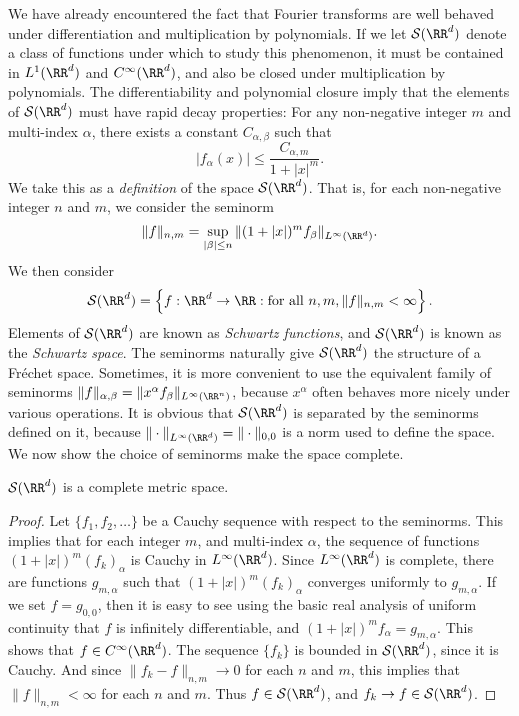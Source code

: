 We have already encountered the fact that Fourier transforms are well behaved under differentiation and multiplication by polynomials. If we let $\mathcal{S}(\RR^d)$ denote a class of functions under which to study this phenomenon, it must be contained in $L^1(\RR^d)$ and $C^\infty(\RR^d)$, and also be closed under multiplication by polynomials. The differentiability and polynomial closure imply that the elements of $\mathcal{S}(\RR^d)$ must have rapid decay properties: For any non-negative integer $m$ and multi-index $\alpha$, there exists a constant $C_{\alpha,\beta}$ such that
%
\[ |f_\alpha(x)| \leq \frac{C_{\alpha,m}}{1 + |x|^m}. \]
%
We take this as a \emph{definition} of the space $\mathcal{S}(\RR^d)$. That is, for each non-negative integer $n$ and $m$, we consider the seminorm
%
\[ \| f \|_{n,m} = \sup_{|\beta| \leq n} \| (1 + |x|)^m f_\beta \|_{L^\infty(\RR^d)}. \]
%
We then consider
%
\[ \mathcal{S}(\RR^d) = \left\{ f: \RR^d \to \RR: \text{for all}\ n,m, \| f \|_{n,m} < \infty \right\}. \]
%
Elements of $\mathcal{S}(\RR^d)$ are known as \emph{Schwartz functions}, and $\mathcal{S}(\RR^d)$ is known as the \emph{Schwartz space}. The seminorms naturally give $\mathcal{S}(\RR^d)$ the structure of a Fr\'{e}chet space. Sometimes, it is more convenient to use the equivalent family of seminorms $\| f \|_{\alpha, \beta} = \| x^\alpha f_\beta \|_{L^\infty(\RR^n)}$, because $x^\alpha$ often behaves more nicely under various operations. It is obvious that $\mathcal{S}(\RR^d)$ is separated by the seminorms defined on it, because $\| \cdot \|_{L^\infty(\RR^d)} = \| \cdot \|_{0,0}$ is a norm used to define the space. We now show the choice of seminorms make the space complete.

\begin{theorem}
    $\mathcal{S}(\RR^d)$ is a complete metric space.
\end{theorem}
\begin{proof}
    Let $\{ f_1,f_2, \dots \}$ be a Cauchy sequence with respect to the seminorms. This implies that for each integer $m$, and multi-index $\alpha$, the sequence of functions $(1 + |x|)^m (f_k)_\alpha$ is Cauchy in $L^\infty(\RR^d)$. Since $L^\infty(\RR^d)$ is complete, there are functions $g_{m,\alpha}$ such that $(1 + |x|)^m (f_k)_\alpha$ converges uniformly to $g_{m,\alpha}$. If we set $f = g_{0,0}$, then it is easy to see using the basic real analysis of uniform continuity that $f$ is infinitely differentiable, and $(1 + |x|)^m f_\alpha = g_{m,\alpha}$. This shows that $f \in C^\infty(\RR^d)$. The sequence $\{ f_k \}$ is bounded in $\mathcal{S}(\RR^d)$, since it is Cauchy. And since $\| f_k - f \|_{n,m} \to 0$ for each $n$ and $m$, this implies that $\| f \|_{n,m} < \infty$ for each $n$ and $m$. Thus $f \in \mathcal{S}(\RR^d)$, and $f_k \to f \in \mathcal{S}(\RR^d)$.
\end{proof}

